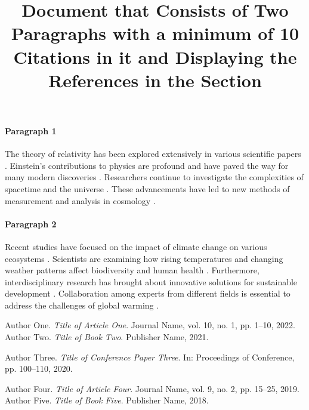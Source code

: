 \documentclass{article}
\begin{document}
	
	\title{Document that Consists of Two Paragraphs with a minimum of 10 Citations in it and Displaying the References in the Section}
	\date{}
	
	\maketitle
	
	
	\paragraph{Paragraph 1}
	
	The theory of relativity has been explored extensively in various scientific papers \citep{author1, author2, author3}. Einstein's contributions to physics are profound and have paved the way for many modern discoveries \citep{author4, author5}. Researchers continue to
	investigate the complexities of spacetime and the universe \citep{author6, author7}. These advancements have led to new methods of measurement and analysis in cosmology \citep{author8}.
	
	
	\paragraph{Paragraph 2}
	
	Recent studies have focused on the impact of climate change on various ecosystems \citep{author9, author10}. Scientists are examining how rising temperatures and changing weather patterns affect biodiversity and human health \citep{author11, author12}. Furthermore, interdisciplinary research has brought about innovative solutions for sustainable development \citep{author13}. Collaboration among experts from different fields is essential to address the challenges of global warming \citep{author14}.
	
	
	
	\newpage 
	
	\begin{thebibliography}{99}
		
		 Author One. \textit{Title of Article One}. Journal Name, vol. 10, no. 1, pp. 1--10, 2022.
		 Author Two. \textit{Title of Book Two}. Publisher Name, 2021.
		
		 Author Three. \textit{Title of Conference Paper Three}. In: Proceedings of Conference, pp. 100--110, 2020.
		
		
		 Author Four. \textit{Title of Article Four}. Journal Name, vol. 9, no. 2, pp. 15--25, 2019.
		 Author Five. \textit{Title of Book Five}. Publisher Name, 2018.
		
	\end{thebibliography}
	
	
\end{document}
